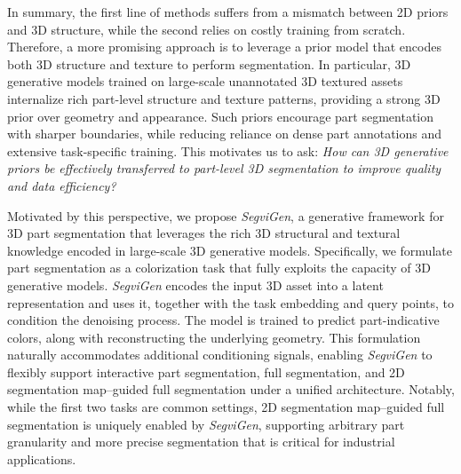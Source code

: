 %
In summary, the first line of methods suffers from a mismatch between 2D priors and 3D structure, while the second relies on costly training from scratch.
%
Therefore, a more promising approach is to leverage a prior model that encodes both 3D structure and texture to perform segmentation.
%
In particular, 3D generative models trained on large-scale unannotated 3D textured assets internalize rich part-level structure and texture patterns, providing a strong 3D prior over geometry and appearance. 
%
Such priors encourage part segmentation with sharper boundaries, while reducing reliance on dense part annotations and extensive task-specific training.
%
This motivates us to ask:
\textit{How can 3D generative priors be effectively transferred to part-level 3D segmentation to improve quality and data efficiency?}


Motivated by this perspective, we propose \textit{SegviGen}, a generative framework for 3D part segmentation that leverages the rich 3D structural and textural knowledge encoded in large-scale 3D generative models.
%
Specifically, we formulate part segmentation as a colorization task that fully exploits the capacity of 3D generative models.
%
\textit{SegviGen} encodes the input 3D asset into a latent representation and uses it, together with the task embedding and query points, to condition the denoising process.
%
The model is trained to predict part-indicative colors, along with reconstructing the underlying geometry.
%
This formulation naturally accommodates additional conditioning signals, enabling \textit{SegviGen} to flexibly support interactive part segmentation, full segmentation, and 2D segmentation map–guided full segmentation under a unified architecture. 
%
Notably, while the first two tasks are common settings, 2D segmentation map–guided full segmentation is uniquely enabled by \textit{SegviGen}, supporting arbitrary part granularity and more precise segmentation that is critical for industrial applications.



